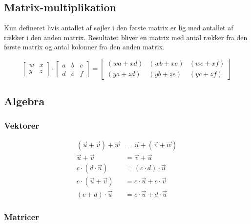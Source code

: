 \subsection{Matrix-multiplikation}
Kun defineret hvis antallet af søjler i den første matrix er lig med antallet af rækker i den anden matrix. Resultatet bliver en matrix med antal rækker fra den første matrix og antal kolonner fra den anden matrix.

\[
    \begin{bmatrix}
        w & x \\
        y & z
    \end{bmatrix}
    \cdot
    \begin{bmatrix}
        a & b & c \\
        d & e & f
    \end{bmatrix}
    =
    \begin{bmatrix}
        (wa + xd) & (wb + xe) & (wc + xf) \\
        (ya + zd) & (yb + ze) & (yc + zf)
    \end{bmatrix}
\]



\subsection{Algebra}
\subsubsection{Vektorer}
\begin{align*}
    (\vec{u} + \vec{v}) + \vec{w} &= \vec{u} + (\vec{v} + \vec{w}) \\
    \vec{u} + \vec{v} &= \vec{v} + \vec{u} \\
    c \cdot (d \cdot \vec{u}) &= (c \cdot d) \cdot \vec{u} \\
    c \cdot (\vec{u} + \vec{v}) &= c \cdot \vec{u} + c \cdot \vec{v} \\
    (c + d) \cdot \vec{u} &= c \cdot \vec{u} + d \cdot \vec{u}
\end{align*}

\subsubsection{Matricer}



